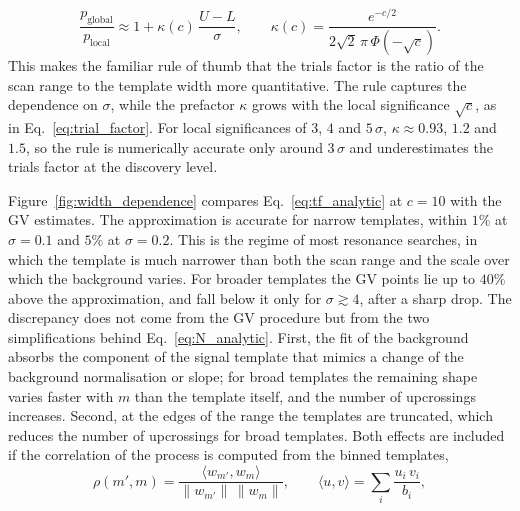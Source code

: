 \begin{equation}
  \frac{p_\text{global}}{p_\text{local}}\approx1+\kappa(c)\,\frac{U-L}{\sigma},\qquad
  \kappa(c)=\frac{e^{-c/2}}{2\sqrt{2}\,\pi\,\Phi(-\sqrt{c})}.
  \label{eq:tf_analytic}
\end{equation}
This makes the familiar rule of thumb that the trials factor is the ratio of the scan range to the template width more quantitative. The rule captures the dependence on $\sigma$, while the prefactor $\kappa$ grows with the local significance $\sqrt{c}$, as in Eq.~\eqref{eq:trial_factor}. For local significances of $3$, $4$ and $5\,\sigma$, $\kappa\approx0.93$, $1.2$ and $1.5$, so the rule is numerically accurate only around $3\,\sigma$ and underestimates the trials factor at the discovery level.

Figure~\ref{fig:width_dependence} compares Eq.~\eqref{eq:tf_analytic} at $c=10$ with the GV estimates. The approximation is accurate for narrow templates, within $1\%$ at $\sigma=0.1$ and $5\%$ at $\sigma=0.2$. This is the regime of most resonance searches, in which the template is much narrower than both the scan range and the scale over which the background varies. For broader templates the GV points lie up to $40\%$ above the approximation, and fall below it only for $\sigma\gtrsim4$, after a sharp drop. The discrepancy does not come from the GV procedure but from the two simplifications behind Eq.~\eqref{eq:N_analytic}. First, the fit of the background absorbs the component of the signal template that mimics a change of the background normalisation or slope; for broad templates the remaining shape varies faster with $m$ than the template itself, and the number of upcrossings increases. Second, at the edges of the range the templates are truncated, which reduces the number of upcrossings for broad templates. Both effects are included if the correlation of the process is computed from the binned templates,
\begin{equation}
  \rho(m',m)=\frac{\langle w_{m'},w_m\rangle}{\lVert w_{m'}\rVert\,\lVert w_m\rVert},\qquad
  \langle u,v\rangle=\sum_i\frac{u_i\,v_i}{b_i},
  \label{eq:rho_binned}
\end{equation}
